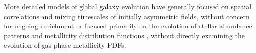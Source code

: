 \documentclass[twocolumn]{aastex61}
\begin{document}
More detailed models of global galaxy evolution have generally focused on spatial correlations and mixing timescales of initially asymmetric fields, without concern for ongoing enrichment \citep[e.g.][]{deAvillez2002,Petit2015} or focused primarily on the evolution of stellar abundance patterns and metallicity distribution functions \citep[e.g][]{Jeon2017,Hirai2017,Escala2018}, without directly examining the evolution of gas-phase metallicity PDFs.

%


%
%

\end{document}

